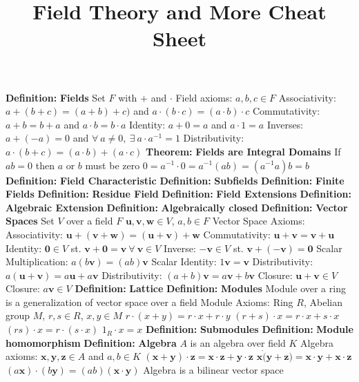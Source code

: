 \documentclass[14pt]{extarticle}
\title{Field Theory and More Cheat Sheet}
\def\Definition{{\color{blue} \textbf{Definition:} }}
\def\Theorem{{\color{red} \textbf{Theorem:} }}
\begin{document}
	\maketitle


	\begin{outline}		
		\1	\Definition \textbf{Fields}
			\2	Set $F$ with $+$ and $\cdot$
			\2	Field axioms:	$a,b,c \in F$
				\3	Associativity: $a + (b + c) = (a+b) + c)$ and $a \cdot (b \cdot c) = (a \cdot b) \cdot c$
				\3	Commutativity: $a + b = b + a$ and $a \cdot b = b \cdot a$
				\3	Identity:	$a + 0 = a$ and $a \cdot 1 = a$
				\3	Inverses:	$a + (-a) = 0$ and $\forall~a \ne 0,~\exists~a \cdot a^{-1} = 1$
				\3	Distributivity:	$a \cdot (b + c) = (a \cdot b) + (a \cdot c)$
		\1	\Theorem \textbf{Fields are Integral Domains}
			\2	If $ab = 0$ then $a$ or $b$ must be zero
			\2	$0 = a^{-1} \cdot 0 = a^{-1}(ab) = (a^{-1}a)b = b$
		\1	\Definition \textbf{Field Characteristic}
		\1	\Definition \textbf{Subfields}	
		\1	\Definition \textbf{Finite Fields}
		\1	\Definition \textbf{Residue Field}
		\1	\Definition \textbf{Field Extensions}
		\1	\Definition \textbf{Algebraic Extension}
		\1	\Definition \textbf{Algebraically closed}
		\1	\Definition \textbf{Vector Spaces}
			\2	Set $V$ over a field $F$ 
			\2	$\bm{u},\bm{v},\bm{w} \in V$, $a,b \in F$
			\2	Vector Space Axioms:
				\3	Associativity:	$\bm{u} + (\bm{v} + \bm{w}) = (\bm{u} + \bm{v}) + \bm{w}$
				\3	Commutativity:	$\bm{u} + \bm{v} = \bm{v} + \bm{u}$
				\3	Identity:	$\bm{0} \in V$ st. $\bm{v} + \bm{0} = \bm{v}~\forall~\bm{v} \in V$
				\3	Inverse:	$\bm{-v} \in V$ st. $\bm{v} + (\bm{-v}) = \bm{0}$
				\3	Scalar Multiplication:	$a(b\bm{v}) = (ab)\bm{v}$
				\3	Scalar Identity:	$1\bm{v} = \bm{v}$
				\3	Distributivity:	$a(\bm{u} + \bm{v}) = a\bm{u} + a\bm{v}$
				\3	Distributivity: $(a + b)\bm{v} = a\bm{v} + b\bm{v}$
				\3	Closure:	$\bm{u} + \bm{v} \in V$
				\3	Closure:	$a\bm{v} \in V$
		\1	\Definition \textbf{Lattice}
		\1	\Definition \textbf{Modules}
			\2	Module over a ring is a generalization of vector space over a field
			\2	Module Axioms:	Ring $R$, Abelian group $M$, $r,s \in R$, $x,y \in M$ 
				\3	$r \cdot (x + y) = r\cdot x + r\cdot y$
				\3	$(r + s) \cdot x = r\cdot x + s \cdot x$
				\3	$(rs)\cdot x = r \cdot (s \cdot x)$
				\3	$1_R \cdot x = x$
		\1	\Definition \textbf{Submodules}
		\1	\Definition \textbf{Module homomorphism}
		\1	\Definition \textbf{Algebra}
			\2	$A$ is an algebra over field $K$ 
			\2	Algebra axioms: $\bm{x},\bm{y},\bm{z} \in A$ and $a,b \in K$
				\3	$(\bm{x} + \bm{y}) \cdot \bm{z} = \bm{x} \cdot \bm{z} + \bm{y} \cdot \bm{z}$
				\3	$\bm{x} \dot (\bm{y} + \bm{z}) = \bm{x}\cdot \bm{y} + \bm{x} \cdot \bm{z}$
				\3	$(a\bm{x})\cdot (b\bm{y}) = (ab)(\bm{x} \cdot \bm{y})$
			\2	Algebra is a bilinear vector space
	\end{outline}
\end{document}
